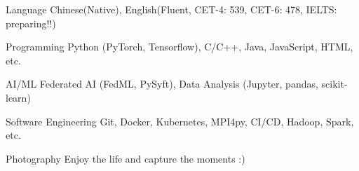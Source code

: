 

\begin{cvskills}
	
\cvskill
{Language} %
{Chinese(Native), English(Fluent, CET-4: 539, CET-6: 478, IELTS: preparing!!)} %

\cvskill
{Programming} %
{Python (PyTorch, Tensorflow), C/C++, Java, JavaScript, HTML, etc.} %

\cvskill
{AI/ML} %
{Federated AI (FedML, PySyft), Data Analysis (Jupyter, pandas, scikit-learn)} %

\cvskill
{Software Engineering} %
{Git, Docker, Kubernetes, MPI4py, CI/CD, Hadoop, Spark, etc.} %

\cvskill
{Photography} %
{Enjoy the life and capture the moments :)} %


\end{cvskills}
